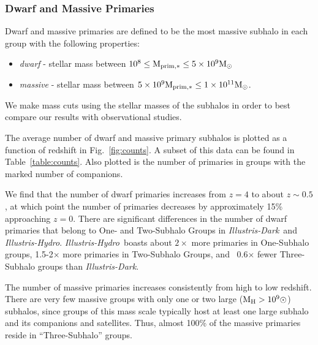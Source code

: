 \documentclass[twocolumn]{aastex63}
\newcommand\msun{\rm{M}_{\odot}}
\newcommand\ID{\textit{Illustris-Dark}}
\newcommand\IH{\textit{Illustris-Hydro}}
\begin{document}
\subsubsection{Dwarf and Massive Primaries}\label{sec:primaries}
Dwarf and massive primaries are defined to be the most massive subhalo in each group with the following properties:
\begin{itemize}
  \item \textit{dwarf} - stellar mass between $10^8 \leq \rm M_{prim,*} \leq 5\times 10^9 \msun$
  \item \textit{massive} - stellar mass between $5\times 10^9 \rm M_{prim,*} \leq 1\times 10^{11} \msun$.
\end{itemize}
We make mass cuts using the stellar masses of the subhalos in order to best compare our results with observational studies. %

The average number of dwarf and massive primary subhalos  %
is plotted as a function of redshift in Fig.~\ref{fig:counts}.%
A subset of this data can be found in Table~\ref{table:counts}. Also plotted is the number of primaries in groups with the marked number of companions.

We find that the number of dwarf primaries increases from $z=4$ to about $z\sim0.5$, at which point the number of primaries decreases by approximately 15\% approaching $z=0$. There are significant differences in the number of dwarf primaries that belong to One- and Two-Subhalo Groups in \ID\ and \IH. \IH\ boasts about $2\times$ more primaries in One-Subhalo groups, 1.5-2$\times$ more primaries in Two-Subhalo Groups, and ~0.6$\times$ fewer Three-Subhalo groups than \ID.

The number of massive primaries increases consistently from high to low redshift. There are very few massive groups with only one or two large ($\rm M_{H} > 10^9\odot$) subhalos, since groups of this mass scale typically host at least one large subhalo and its companions and satellites. Thus, almost 100\% of the massive primaries reside in ``Three-Subhalo'' groups. 
\end{document}
